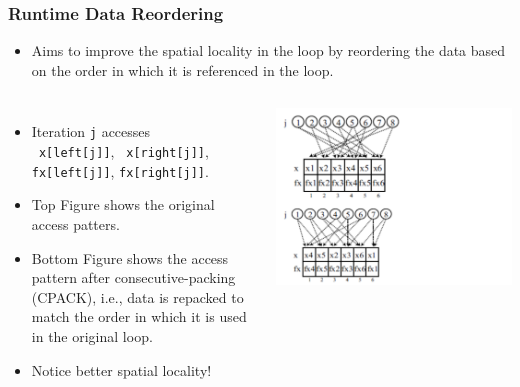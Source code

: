 \documentclass{beamer}
\newcommand{\emp}[1]{\textcolor{DikuRed}{ #1}}
\newcommand{\emphh}[1]{\textcolor{CosGreen}{ #1}}
\begin{document}
\begin{frame}[fragile,t]
  \frametitle{Runtime Data Reordering}

\begin{itemize}
    \item Aims to improve the \emphh{spatial locality} in the loop
            by reordering the data based on the order in which it is
            referenced in the loop.
\end  {itemize}


\begin{columns}
\begin{itemize}
    \item Iteration {\tt j} accesses\\{\tt~x[left[j]]}, {\tt~x[right[j]]}, 
                                     {\tt fx[left[j]]}, {\tt fx[right[j]]}.
    \item Top Figure shows the original access patters.
    \item Bottom Figure shows the access pattern after consecutive-packing (CPACK), 
            i.e., data is repacked to match the order
            in which it is used in the original loop.
    \item \emp{Notice better spatial locality!}
\end  {itemize}
\includegraphics[width=53ex]{ParTeaserFigs/DataReordering1}
\end{columns}
 
\end{frame}
\end{document}
